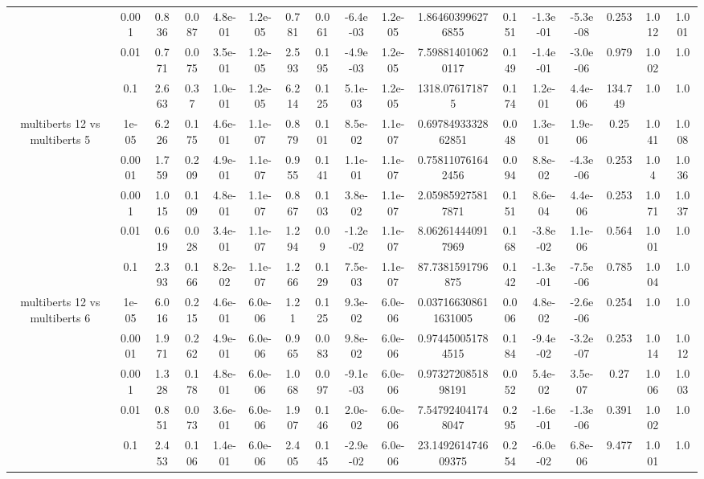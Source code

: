 \begin{tabular}{|c|c|c|c|c|c|c|c|c|c|c|c|c|c|c|c|c|}
 & 0.001 & 0.836 & 0.087 & 4.8e-01 & 1.2e-05 & 0.781 & 0.061 & -6.4e-03 & 1.2e-05 & 1.864603996276855 & 0.151 & -1.3e-01 & -5.3e-08 & 0.253 & 1.012 & 1.001 \\
 & 0.01 & 0.771 & 0.075 & 3.5e-01 & 1.2e-05 & 2.593 & 0.195 & -4.9e-03 & 1.2e-05 & 7.598814010620117 & 0.149 & -1.4e-01 & -3.0e-06 & 0.979 & 1.002 & 1.0 \\
 & 0.1 & 2.663 & 0.37 & 1.0e-01 & 1.2e-05 & 6.214 & 0.125 & 5.1e-03 & 1.2e-05 & 1318.076171875 & 0.174 & 1.2e-01 & 4.4e-06 & 134.749 & 1.0 & 1.0 \\
\hline
\multirow{5}{*}{multiberts 12 vs multiberts 5} & 1e-05 & 6.226 & 0.175 & 4.6e-01 & 1.1e-07 & 0.879 & 0.101 & 8.5e-02 & 1.1e-07 & 0.6978493332862851 & 0.048 & 1.3e-01 & 1.9e-06 & 0.25 & 1.041 & 1.008 \\
 & 0.0001 & 1.759 & 0.209 & 4.9e-01 & 1.1e-07 & 0.955 & 0.141 & 1.1e-01 & 1.1e-07 & 0.758110761642456 & 0.094 & 8.8e-02 & -4.3e-06 & 0.253 & 1.04 & 1.036 \\
 & 0.001 & 1.015 & 0.109 & 4.8e-01 & 1.1e-07 & 0.867 & 0.103 & 3.8e-02 & 1.1e-07 & 2.059859275817871 & 0.151 & 8.6e-04 & 4.4e-06 & 0.253 & 1.071 & 1.037 \\
 & 0.01 & 0.619 & 0.028 & 3.4e-01 & 1.1e-07 & 1.294 & 0.09 & -1.2e-02 & 1.1e-07 & 8.062614440917969 & 0.168 & -3.8e-02 & 1.1e-06 & 0.564 & 1.001 & 1.0 \\
 & 0.1 & 2.393 & 0.166 & 8.2e-02 & 1.1e-07 & 1.266 & 0.129 & 7.5e-03 & 1.1e-07 & 87.7381591796875 & 0.142 & -1.3e-01 & -7.5e-06 & 0.785 & 1.004 & 1.0 \\
\hline
\multirow{5}{*}{multiberts 12 vs multiberts 6} & 1e-05 & 6.016 & 0.215 & 4.6e-01 & 6.0e-06 & 1.21 & 0.125 & 9.3e-02 & 6.0e-06 & 0.037166308611631005 & 0.006 & 4.8e-02 & -2.6e-06 & 0.254 & 1.0 & 1.0 \\
 & 0.0001 & 1.971 & 0.262 & 4.9e-01 & 6.0e-06 & 0.965 & 0.083 & 9.8e-02 & 6.0e-06 & 0.974450051784515 & 0.184 & -9.4e-02 & -3.2e-07 & 0.253 & 1.014 & 1.012 \\
 & 0.001 & 1.328 & 0.178 & 4.8e-01 & 6.0e-06 & 1.068 & 0.097 & -9.1e-03 & 6.0e-06 & 0.9732720851898191 & 0.052 & 5.4e-02 & 3.5e-07 & 0.27 & 1.006 & 1.003 \\
 & 0.01 & 0.851 & 0.073 & 3.6e-01 & 6.0e-06 & 1.907 & 0.146 & 2.0e-02 & 6.0e-06 & 7.547924041748047 & 0.295 & -1.6e-01 & -1.3e-06 & 0.391 & 1.002 & 1.0 \\
 & 0.1 & 2.453 & 0.106 & 1.4e-01 & 6.0e-06 & 2.405 & 0.145 & -2.9e-02 & 6.0e-06 & 23.149261474609375 & 0.254 & -6.0e-02 & 6.8e-06 & 9.477 & 1.001 & 1.0 \\

\end{tabular}
